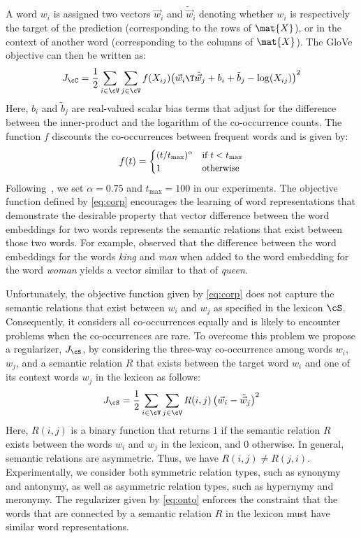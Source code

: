 \documentclass[letterpaper]{article}
\newcommand{\citet}[1]{\citeauthor{#1} \shortcite{#1}}
\begin{document}
A word $w_i$ is assigned two vectors $\vec{w}_i$ and $\tilde{\vec{w}}_i$ denoting whether $w_i$ is respectively
the target of the prediction  (corresponding to the rows of $\mat{X}$),
or in the context of another word (corresponding to the columns of $\mat{X}$).
The GloVe objective can then be written as:
\begin{equation}
\small
\label{eq:corp}
J_{\cC} = \frac{1}{2} \sum_{i \in \cV} \sum_{j \in \cV} f(X_{ij}) {\left(\vec{w}_i\T\tilde{\vec{w}}_j +b_i + \tilde{b}_j  - \log(X_{ij}) \right)}^2
\end{equation}
Here, $b_i$ and $\tilde{b}_j$ are real-valued scalar bias terms that adjust for
the difference between the inner-product and the logarithm of
the co-occurrence counts.
The function $f$ discounts the co-occurrences between frequent words and is given by:
\begin{equation}
\small
f(t) = \begin{cases} (t/t_{\max})^\alpha & \text{if $t < t_{\max}$} \\
				1 & \text{otherwise}
	\end{cases}
\end{equation}
Following~\cite{Pennington:EMNLP:2014}, we set $\alpha = 0.75$ and $t_{\max} = 100$ in our experiments.
The objective function defined by \eqref{eq:corp} encourages the learning of word representations that demonstrate the
desirable property that vector difference between the word embeddings for two words represents the semantic relations
that exist between those two words. For example, \citet{Mikolov:NAACL:2013} observed that
the difference between the word embeddings for the words \emph{king} and \emph{man} when added to the word embedding
for the word \emph{woman} yields a vector similar to that of \emph{queen}.

Unfortunately, the objective function given by \eqref{eq:corp} does not capture the semantic relations that exist between $w_i$ and $w_j$
as specified in the lexicon $\cS$. Consequently, it considers all co-occurrences equally and is likely to encounter problems when the
co-occurrences are rare.
To overcome this problem we propose a regularizer, $J_{\cS}$,  by considering the three-way co-occurrence
among words $w_i$, $w_j$, and a semantic relation $R$ that exists between the target word $w_i$ and
one of its context words $w_j$ in the lexicon as follows:
\begin{equation}
\small
\label{eq:onto}
J_{\cS} = \frac{1}{2} \sum_{i \in \cV}  \sum_{j \in \cV} R(i,j) \left(\vec{w}_i - \tilde{\vec{w}}_j \right)^2
\end{equation}
Here, $R(i,j)$ is a binary function that returns $1$ if  the semantic relation $R$ exists between the words $w_i$ and $w_j$
in the lexicon, and $0$ otherwise.
In general, semantic relations are asymmetric. Thus, we have $R(i,j) \neq R(j,i)$.
Experimentally, we consider both symmetric relation types, such as synonymy and antonymy, as well as
asymmetric relation types, such as hypernymy and meronymy.
The regularizer given by \eqref{eq:onto} enforces the constraint that the words that are connected by a semantic relation $R$ in the
lexicon must have similar word representations.
\end{document}

